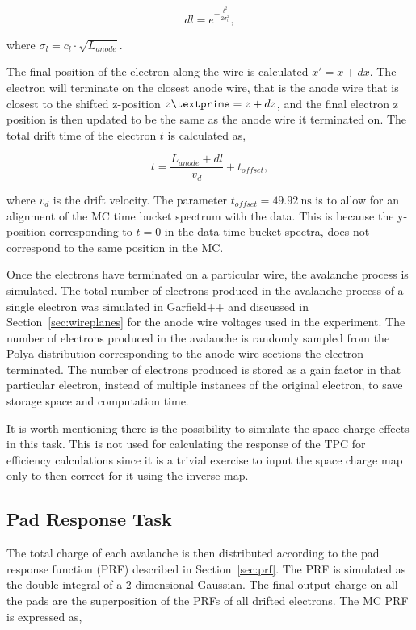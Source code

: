\begin{equation}
dl = e^{-\frac{t^2}{2\sigma_{l}^2}},
\end{equation}

where $\sigma_{l}=c_{l}\cdot\sqrt{L_{anode}}$. 

The final position of the electron along the wire is calculated  $x' = x + dx$. The electron will terminate on the closest anode wire, that is the anode wire that is closest to the shifted z-position $z\textprime = z + dz$, and the final electron z position is then updated to be the same as the anode wire it terminated on. The total drift time of the electron $t$ is calculated as,

\begin{equation}
 t = \frac{L_{anode} + dl}{v_d} + t_{offset},
 \label{eq:electronTime}
\end{equation}
 
where $v_d$ is the drift velocity. The parameter $t_{offset} = \SI{49.92}{\nano\second}$ is to allow for an alignment of the MC time bucket spectrum with the data. This is because the y-position corresponding to $t=0$ in the data time bucket spectra, does not correspond to the same position in the MC.  

Once the electrons have terminated on a particular wire, the avalanche process is simulated. The total number of electrons produced in the avalanche process of a single electron was simulated in Garfield++ and discussed in Section~\ref{sec:wireplanes} for the anode wire voltages used in the experiment. The number of electrons produced in the avalanche is randomly sampled from the Polya distribution  corresponding to the anode wire sections the electron terminated. The number of electrons produced is stored as a gain factor in that particular electron, instead of multiple instances of the original electron, to save storage space and computation time. 


It is worth mentioning there is the possibility to simulate the space charge effects in this task. This is not used for calculating the response of the TPC for efficiency calculations since it is a trivial exercise to input the space charge map only to then correct for it using the inverse map.  

\subsection{Pad Response Task}
The total charge of each avalanche is then distributed according to the pad response function (PRF) described in Section~\ref{sec:prf}. The PRF is simulated as the double integral of a 2-dimensional Gaussian. The final output charge on all the pads are the superposition of the PRFs of all drifted electrons. The MC PRF is expressed as, 

